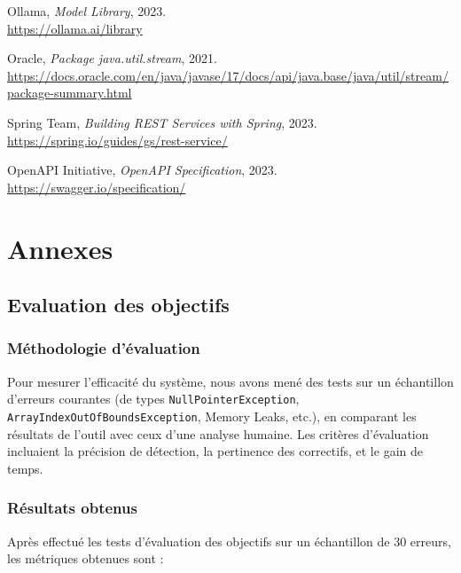 \documentclass[12pt,a4paper]{report}
\begin{document}
	\begin{enumerate}[label=\textbf{[\arabic*]}, start=2]
		\item Ollama, \emph{Model Library}, 2023. \\
		\url{https://ollama.ai/library}
		
		\item Oracle, \emph{Package java.util.stream}, 2021. \\
		\url{https://docs.oracle.com/en/java/javase/17/docs/api/java.base/java/util/stream/package-summary.html}
		
		\item Spring Team, \emph{Building REST Services with Spring}, 2023. \\
		\url{https://spring.io/guides/gs/rest-service/}
		
		\item OpenAPI Initiative, \emph{OpenAPI Specification}, 2023. \\
		\url{https://swagger.io/specification/}
	\end{enumerate}
	
	\chapter*{Annexes}
	
	\section*{Evaluation des objectifs}
	
	\subsection*{Méthodologie d'évaluation}
	
	
	Pour mesurer l’efficacité du système, nous avons mené des tests sur un échantillon d'erreurs courantes (de types \verb|NullPointerException|, \verb|ArrayIndexOutOfBoundsException|, Memory Leaks, etc.), en comparant les résultats de l’outil avec ceux d’une analyse humaine. Les critères d’évaluation incluaient la précision de détection, la pertinence des correctifs, et le gain de temps.
	
	\subsection*{Résultats obtenus}
	
	
	Après effectué les tests d'évaluation des objectifs sur un échantillon de 30 erreurs, les métriques obtenues sont :
	
\end{document}
